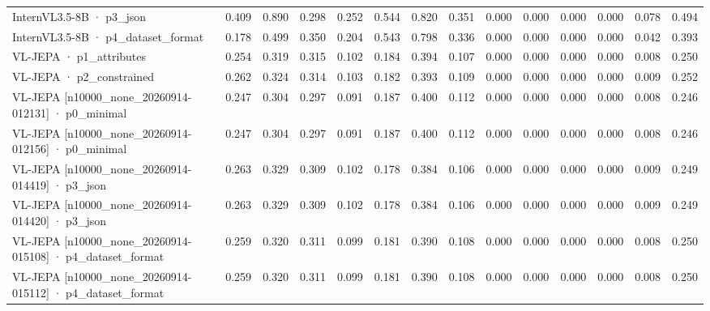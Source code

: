 \begin{tabular}{lrrrrrrrrrrrrr}
InternVL3.5-8B · p3\_json & 0.409 & 0.890 & 0.298 & 0.252 & 0.544 & 0.820 & 0.351 & 0.000 & 0.000 & 0.000 & 0.000 & 0.078 & 0.494 \\
InternVL3.5-8B · p4\_dataset\_format & 0.178 & 0.499 & 0.350 & 0.204 & 0.543 & 0.798 & 0.336 & 0.000 & 0.000 & 0.000 & 0.000 & 0.042 & 0.393 \\
VL-JEPA · p1\_attributes & 0.254 & 0.319 & 0.315 & 0.102 & 0.184 & 0.394 & 0.107 & 0.000 & 0.000 & 0.000 & 0.000 & 0.008 & 0.250 \\
VL-JEPA · p2\_constrained & 0.262 & 0.324 & 0.314 & 0.103 & 0.182 & 0.393 & 0.109 & 0.000 & 0.000 & 0.000 & 0.000 & 0.009 & 0.252 \\
VL-JEPA [n10000\_none\_20260914-012131] · p0\_minimal & 0.247 & 0.304 & 0.297 & 0.091 & 0.187 & 0.400 & 0.112 & 0.000 & 0.000 & 0.000 & 0.000 & 0.008 & 0.246 \\
VL-JEPA [n10000\_none\_20260914-012156] · p0\_minimal & 0.247 & 0.304 & 0.297 & 0.091 & 0.187 & 0.400 & 0.112 & 0.000 & 0.000 & 0.000 & 0.000 & 0.008 & 0.246 \\
VL-JEPA [n10000\_none\_20260914-014419] · p3\_json & 0.263 & 0.329 & 0.309 & 0.102 & 0.178 & 0.384 & 0.106 & 0.000 & 0.000 & 0.000 & 0.000 & 0.009 & 0.249 \\
VL-JEPA [n10000\_none\_20260914-014420] · p3\_json & 0.263 & 0.329 & 0.309 & 0.102 & 0.178 & 0.384 & 0.106 & 0.000 & 0.000 & 0.000 & 0.000 & 0.009 & 0.249 \\
VL-JEPA [n10000\_none\_20260914-015108] · p4\_dataset\_format & 0.259 & 0.320 & 0.311 & 0.099 & 0.181 & 0.390 & 0.108 & 0.000 & 0.000 & 0.000 & 0.000 & 0.008 & 0.250 \\
VL-JEPA [n10000\_none\_20260914-015112] · p4\_dataset\_format & 0.259 & 0.320 & 0.311 & 0.099 & 0.181 & 0.390 & 0.108 & 0.000 & 0.000 & 0.000 & 0.000 & 0.008 & 0.250 \\
\bottomrule
\end{tabular}
